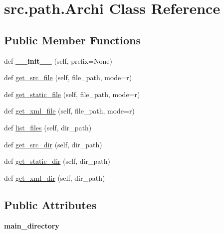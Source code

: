 \hypertarget{classsrc_1_1path_1_1_archi}{}\section{src.\+path.\+Archi Class Reference}
\label{classsrc_1_1path_1_1_archi}
\subsection*{Public Member Functions}
\begin{DoxyCompactItemize}
\item 
\hypertarget{classsrc_1_1path_1_1_archi_a5e9645bae7e370cb284caf25887e1a30}{}\label{classsrc_1_1path_1_1_archi_a5e9645bae7e370cb284caf25887e1a30} 
def {\bfseries \+\_\+\+\_\+init\+\_\+\+\_\+} (self, prefix=None)
\item 
def \hyperlink{classsrc_1_1path_1_1_archi_ae62f2a91aebfa1be024b7db7ec22fcb2}{get\+\_\+src\+\_\+file} (self, file\+\_\+path, mode=\textquotesingle{}r\textquotesingle{})
\item 
def \hyperlink{classsrc_1_1path_1_1_archi_a163cd2e27a1fb14756a4000292445411}{get\+\_\+static\+\_\+file} (self, file\+\_\+path, mode=\textquotesingle{}r\textquotesingle{})
\item 
def \hyperlink{classsrc_1_1path_1_1_archi_a3aae2cae1ec9db02047b419df0f6ada0}{get\+\_\+xml\+\_\+file} (self, file\+\_\+path, mode=\textquotesingle{}r\textquotesingle{})
\item 
def \hyperlink{classsrc_1_1path_1_1_archi_a9c45a02901639a0d219c928dafe52530}{list\+\_\+files} (self, dir\+\_\+path)
\item 
def \hyperlink{classsrc_1_1path_1_1_archi_ae71e9ba49e5ed1728315339d651c9db6}{get\+\_\+src\+\_\+dir} (self, dir\+\_\+path)
\item 
def \hyperlink{classsrc_1_1path_1_1_archi_acb1d85cb548817e809d190c6a0ff1298}{get\+\_\+static\+\_\+dir} (self, dir\+\_\+path)
\item 
def \hyperlink{classsrc_1_1path_1_1_archi_a280bc53aa0db4662ffd7a9e5938c597d}{get\+\_\+xml\+\_\+dir} (self, dir\+\_\+path)
\end{DoxyCompactItemize}
\subsection*{Public Attributes}
\begin{DoxyCompactItemize}
\item 
\hypertarget{classsrc_1_1path_1_1_archi_a2b7caf87a5979f1f7256677a5a671dd9}{}\label{classsrc_1_1path_1_1_archi_a2b7caf87a5979f1f7256677a5a671dd9} 
{\bfseries main\+\_\+directory}
\end{DoxyCompactItemize}


